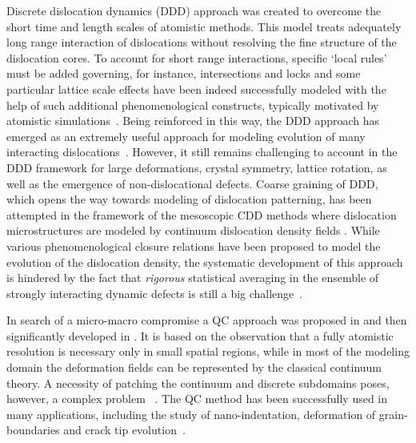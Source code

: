 \documentclass[CRPHYS,Unicode,manuscript]{cedram}
\begin{document}
Discrete dislocation dynamics (DDD) approach was created to  overcome the short time and length scales  of atomistic methods. This model treats adequately    long range interaction of dislocations without  resolving   the  fine structure of the dislocation cores.    To account for short range interactions, specific `local rules' must be added governing, for instance,  intersections and locks and  some particular  lattice scale  effects  have been indeed successfully  modeled  with the help of such additional phenomenological constructs, typically motivated by atomistic simulations~\cite{Kubin1992-bs,Devincre1992-mu,Cazacu2013-no,Po2014-qu,Wang2014-sb, Geslin2017-fb,Kohnert2021-ts}.  Being reinforced in this way,  the  DDD approach has emerged as an extremely useful approach for modeling  evolution of many interacting dislocations~\cite{Cai2006-fe,Dmitrieva2010-qn}. However, it  still  remains challenging  to account in the DDD framework for large  deformations, crystal symmetry, lattice rotation, as well as the emergence of non-dislocational defects.  Coarse graining of DDD,  which opens the way towards modeling of  dislocation patterning, has been attempted in the framework of the  mesoscopic  CDD methods where dislocation microstructures are modeled by continuum  dislocation density fields \cite{Starkey2020-qb,Acharya2006-nm,Sandfeld_undated-nm}. While various  phenomenological closure relations have been proposed to model the evolution of the  
dislocation density, the systematic  development of this approach is hindered by the fact that   \emph{rigorous} statistical averaging in the ensemble of strongly interacting dynamic defects is still  a big challenge~\cite{Valdenaire2016-yp}.

In search of a micro-macro compromise a  QC  approach was   proposed  in \cite{Tadmor1996-qi} and  then significantly developed in  \cite{Shenoy1999-gh,Miller2002-pa,Dobson2007-ax,Sorkin2014-jy,Kochmann2016-bv}. It is based on the observation that a fully atomistic resolution is  necessary  only in small spatial regions, while in most of the modeling domain the deformation fields  can be  represented  by  the classical continuum theory. A   necessity of patching the continuum and discrete subdomains poses, however,   a complex problem ~\cite{Miller2002-pa,Tadmor2011-mo}. The QC method has been successfully used in many applications, including the study of nano-indentation, deformation of grain-boundaries and crack tip evolution~\cite{Rodney1999-em,Knap2003-pp,Yu2017-mg,Jin2018-ty}.
\end{document}
